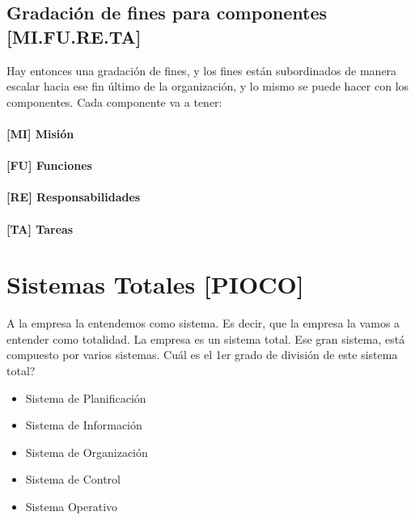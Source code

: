 \hypertarget{gradaciuxf3n-de-fines-para-componentes-mi.fu.re.ta}{%
\subsection{Gradación de fines para componentes
{[}MI.FU.RE.TA{]}}\label{gradaciuxf3n-de-fines-para-componentes-mi.fu.re.ta}}

Hay entonces una gradación de fines, y los fines están subordinados de
manera escalar hacia ese fin último de la organización, y lo mismo se
puede hacer con los componentes. Cada componente va a tener: 
\paragraph{{[}MI{]} Misión}
\paragraph{{[}FU{]} Funciones}
\paragraph{{[}RE{]} Responsabilidades}
\paragraph{{[}TA{]} Tareas}


\hypertarget{sistemas-totales-pioco}{%
\section{Sistemas Totales {[}PIOCO{]}}\label{sistemas-totales-pioco}}

A la empresa la entendemos como sistema. Es decir, que la empresa la
vamos a entender como totalidad. La empresa es un sistema total. Ese
gran sistema, está compuesto por varios sistemas. Cuál es el 1er grado
de división de este sistema total?

\begin{itemize}
  \setlength\itemsep{-1em}
\item
  Sistema de Planificación
\item
  Sistema de Información
\item
  Sistema de Organización
\item
  Sistema de Control
\item
  Sistema Operativo
\end{itemize}

